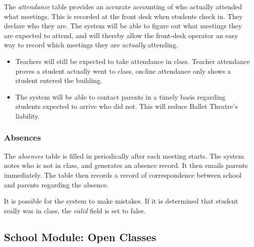 \documentclass[11pt]{article}
\begin{document}
The \emph{attendance} table provides an accurate accounting of who actually attended what meetings.  This is recorded at the front desk when students check in.  They declare who they are.  The system will be able to figure out what meetings they are expected to attend, and will thereby allow the front-desk operator an easy way to record which meetings they are \emph{actually} attending.

\begin{itemize}

 \item Teachers will still be expected to take attendance in class.  Teacher attendance proves a student actually went to class, on-line attendance only shows a student entered the building.

 \item The system will be able to contact parents in a timely basis regarding students expected to arrive who did not.  This will reduce Ballet Theatre's liability.

 \end{itemize}

\subsubsection{Absences}

The \emph{absences} table is filled in periodically after each meeting starts.  The system notes who is not in class, and generates an absence record.  It then emails parents immediately.  The table then records a record of correspondence between school and parents regarding the absence.

It is possible for the system to make mistakes.  If it is determined that student really was in class, the \emph{valid} field is set to false.

\subsection{School Module: Open Classes}
\end{document}
